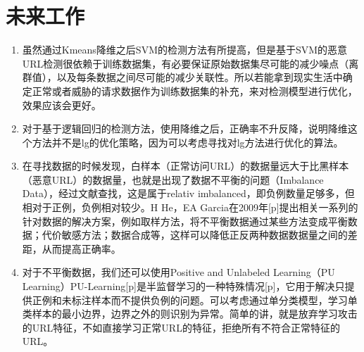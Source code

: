 \section{未来工作}
\begin{enumerate}
    \item 虽然通过Kmeans降维之后SVM的检测方法有所提高，但是基于SVM的恶意URL检测很依赖于训练数据集，有必要保证原始数据集尽可能的减少噪点（离群值），以及每条数据之间尽可能的减少关联性。所以若能拿到现实生活中确定正常或者威胁的请求数据作为训练数据集的补充，来对检测模型进行优化，效果应该会更好。
    \item 对于基于逻辑回归的检测方法，使用降维之后，正确率不升反降，说明降维这个方法并不是lg的优化策略，因为可以考虑寻找对lg方法进行优化的算法。 
    \item 在寻找数据的时候发现，白样本（正常访问URL）的数据量远大于比黑样本（恶意URL）的数据量，也就是出现了数据不平衡的问题（Imbalance Data），经过文献查找，这是属于relativ imbalanced，即负例数量足够多，但相对于正例，负例相对较少。H He，EA Garcia在2009年[p]提出相关一系列的针对数据的解决方案，例如取样方法，将不平衡数据通过某些方法变成平衡数据；代价敏感方法；数据合成等，这样可以降低正反两种数据数据量之间的差距，从而提高正确率。
    \item 对于不平衡数据，我们还可以使用Positive and Unlabeled Learning（PU Learning）PU-Learning[p]是半监督学习的一种特殊情况[p]，它用于解决只提供正例和未标注样本而不提供负例的问题。可以考虑通过单分类模型，学习单类样本的最小边界，边界之外的则识别为异常。简单的讲，就是放弃学习攻击的URL特征，不如直接学习正常URL的特征，拒绝所有不符合正常特征的URL。 
\end{enumerate}
